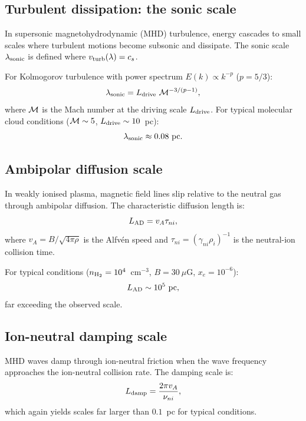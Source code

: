 \documentclass{mnras}
\begin{document}
\subsection{Turbulent dissipation: the sonic scale}

In supersonic magnetohydrodynamic (MHD) turbulence, energy cascades to small scales where turbulent motions become subsonic and dissipate. The sonic scale $\lambda_{\rm sonic}$ is defined where $v_{\rm turb}(\lambda) = c_s$.

For Kolmogorov turbulence with power spectrum $E(k) \propto k^{-p}$ ($p = 5/3$):
\begin{equation}
\lambda_{\rm sonic} = L_{\rm drive}~{\cal M}^{-3/(p-1)},
\end{equation}
where ${\cal M}$ is the Mach number at the driving scale $L_{\rm drive}$. For typical molecular cloud conditions (${\cal M} \sim 5$, $L_{\rm drive} \sim 10$~pc):
\begin{equation}
\lambda_{\rm sonic} \approx 0.08~{\rm pc}.
\end{equation}

\subsection{Ambipolar diffusion scale}

In weakly ionised plasma, magnetic field lines slip relative to the neutral gas through ambipolar diffusion. The characteristic diffusion length is:
\begin{equation}
L_{\rm AD} = v_A \tau_{ni},
\end{equation}
where $v_A = B/\sqrt{4\pi\rho}$ is the Alfv\'en speed and $\tau_{ni} = (\gamma_{ni} \rho_i)^{-1}$ is the neutral-ion collision time.

For typical conditions ($n_{\rm H_2} = 10^4$~cm$^{-3}$, $B = 30~\mu$G, $x_e = 10^{-6}$):
\begin{equation}
L_{\rm AD} \sim 10^5~{\rm pc},
\end{equation}
far exceeding the observed scale.

\subsection{Ion-neutral damping scale}

MHD waves damp through ion-neutral friction when the wave frequency approaches the ion-neutral collision rate. The damping scale is:
\begin{equation}
L_{\rm damp} = \frac{2\pi v_A}{\nu_{ni}},
\end{equation}
which again yields scales far larger than $0.1$~pc for typical conditions.
\end{document}
